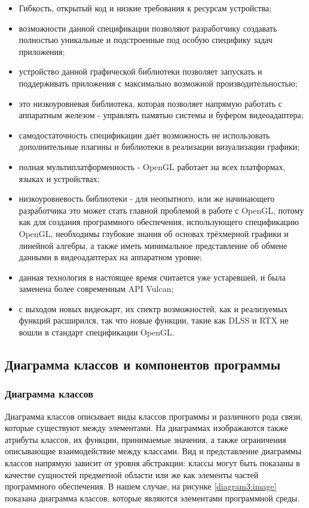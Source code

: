 \begin{itemize}
	\item Гибкость, открытый код и низкие требования к ресурсам устройства;
	\item возможности данной спецификации позволяют разработчику создавать полностью уникальные и подстроенные под особую специфику задач приложения;
	\item устройство данной графической библиотеки позволяет запускать и поддерживать приложения с максимально возможной производительностью;
	\item это низкоуровневая библиотека, которая позволяет напрямую работать с аппаратным железом - управлять памятью системы и буфером видеоадаптера;
	\item самодостаточность спецификации даёт возможность не использовать дополнительные плагины и библиотеки в реализации визуализации графики;
	\item полная мультиплатформенность - OpenGL работает на всех платформах, языках и устройствах;
	\item низкоуровневость библиотеки - для неопытного, или же начинающего разработчика это может стать главной проблемой в работе с OpenGL, потому как для создания программного обеспечения, использующего спецификацию OpenGL, необходимы глубокие знания об основах трёхмерной графики и линейной алгебры, а также иметь минимальное представление об обмене данными в видеоадаптерах на аппаратном уровне;
	\item данная технология в настоящее время считается уже устаревшей, и была заменена более современным API Vulcan;
	\item с выходом новых видеокарт, их спектр возможностей, как и реализуемых функций расширился, так что новые функции, такие как DLSS и RTX не вошли в стандарт спецификации OpenGL.
	
\end{itemize}

\subsection{Диаграмма классов и компонентов программы}

\subsubsection{Диаграмма классов}

Диаграмма классов описывает виды классов программы и различного рода связи, которые существуют между элементами. На диаграммах изображаются также атрибуты классов, их функции, принимаемые значения, а также ограничения описывающие взаимодействие между классами. Вид и представление диаграммы классов напрямую зависит от уровня абстракции: классы могут быть показаны в качестве сущностей предметной области или же как элементы частей программного обеспечения. В нашем случае, на рисунке \ref{diagram3:image} показана диаграмма классов, которые являются элементами программной среды. 

